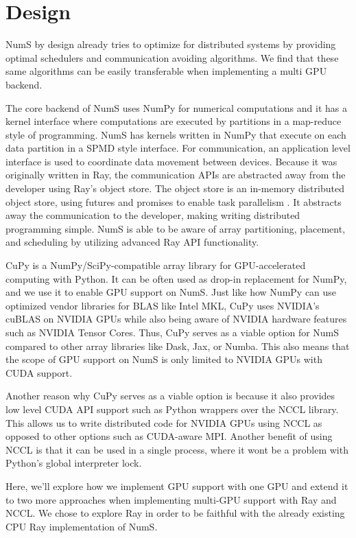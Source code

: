 \documentclass{article}
\begin{document}
\section{Design}
NumS by design already tries to optimize for distributed systems by providing optimal schedulers and communication avoiding algorithms. \cite{nums} We find that these same algorithms can be easily transferable when implementing a multi GPU backend.

The core backend of NumS uses NumPy for numerical computations and it has a kernel interface where computations are executed by partitions in a map-reduce style of programming. NumS has kernels written in NumPy that execute on each data partition in a SPMD style interface. For communication, an application level interface is used to coordinate data movement between devices. Because it was originally written in Ray, the communication APIs are abstracted away from the developer using Ray's object store. The object store is an in-memory distributed object store, using futures and promises to enable task parallelism \cite{ray}. It abstracts away the communication to the developer, making writing distributed programming simple. NumS is able to be aware of array partitioning, placement, and scheduling by utilizing advanced Ray API functionality.

CuPy is a NumPy/SciPy-compatible array library for GPU-accelerated computing with Python. It can be often used as drop-in replacement for NumPy, and we use it to enable GPU support on NumS. \cite{cupy} Just like how NumPy can use optimized vendor libraries for BLAS like Intel MKL, CuPy uses NVIDIA's cuBLAS on NVIDIA GPUs while also being aware of NVIDIA hardware features such as NVIDIA Tensor Cores. Thus, CuPy serves as a viable option for NumS compared to other array libraries like Dask, Jax, or Numba. This also means that the scope of GPU support on NumS is only limited to NVIDIA GPUs with CUDA support.

Another reason why CuPy serves as a viable option is because it also provides low level CUDA API support such as Python wrappers over the NCCL library. This allows us to write distributed code for NVIDIA GPUs using NCCL as opposed to other options such as CUDA-aware MPI. Another benefit of using NCCL is that it can be used in a single process, where it wont be a problem with Python's global interpreter lock.

Here, we'll explore how we implement GPU support with one GPU and extend it to two more approaches when implementing multi-GPU support with Ray and NCCL. We chose to explore Ray in order to be faithful with the already existing CPU Ray implementation of NumS.
\end{document}
